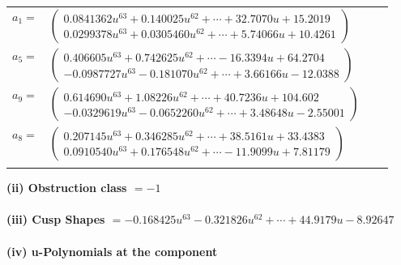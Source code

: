 \documentclass[1p]{elsarticle_modified}
\theoremstyle{definition}
\begin{document}
\begin{tabular}{m{7pt} m{180pt} m{7pt} m{180pt} }
\flushright $a_{1}=$&$\begin{pmatrix}0.0841362 u^{63}+0.140025 u^{62}+\cdots+32.7070 u+15.2019\\0.0299378 u^{63}+0.0305460 u^{62}+\cdots+5.74066 u+10.4261\end{pmatrix}$ \\
\flushright $a_{5}=$&$\begin{pmatrix}0.406605 u^{63}+0.742625 u^{62}+\cdots-16.3394 u+64.2704\\-0.0987727 u^{63}-0.181070 u^{62}+\cdots+3.66166 u-12.0388\end{pmatrix}$ \\
\flushright $a_{9}=$&$\begin{pmatrix}0.614690 u^{63}+1.08226 u^{62}+\cdots+40.7236 u+104.602\\-0.0329619 u^{63}-0.0652260 u^{62}+\cdots+3.48648 u-2.55001\end{pmatrix}$ \\
\flushright $a_{8}=$&$\begin{pmatrix}0.207145 u^{63}+0.346285 u^{62}+\cdots+38.5161 u+33.4383\\0.0910540 u^{63}+0.176548 u^{62}+\cdots-11.9099 u+7.81179\end{pmatrix}$\\&\end{tabular}
\flushleft \textbf{(ii) Obstruction class $= -1$}\\~\\
\flushleft \textbf{(iii) Cusp Shapes $= -0.168425 u^{63}-0.321826 u^{62}+\cdots+44.9179 u-8.92647$}\\~\\
\newpage\renewcommand{\arraystretch}{1}
\flushleft \textbf{(iv) u-Polynomials at the component}\newline \\
\end{document}
